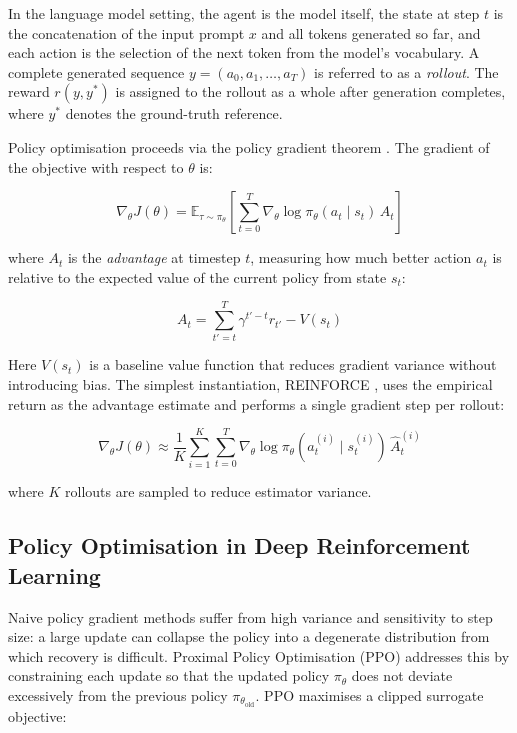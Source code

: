 \documentclass{iutbscthesis}
\begin{document}
In the language model setting, the agent is the model itself, the state at step $t$ is the
concatenation of the input prompt $x$ and all tokens generated so far, and each action
is the selection of the next token from the model's vocabulary. A complete generated
sequence $y = (a_0, a_1, \ldots, a_T)$ is referred to as a \textit{rollout}. The reward $r(y, y^*)$
is assigned to the rollout as a whole after generation completes, where $y^*$ denotes the
ground-truth reference.

Policy optimisation proceeds via the policy gradient theorem \cite{sutton1999policy}.
The gradient of the objective with respect to $\theta$ is:

\begin{equation}
    \nabla_\theta J(\theta) = \mathbb{E}_{\tau \sim \pi_\theta}\!\left[
        \sum_{t=0}^{T} \nabla_\theta \log \pi_\theta(a_t \mid s_t)\, A_t
    \right]
\end{equation}

\noindent where $A_t$ is the \textit{advantage} at timestep $t$, measuring how much better action
$a_t$ is relative to the expected value of the current policy from state $s_t$:

\begin{equation}
    A_t = \sum_{t'=t}^{T} \gamma^{t'-t} r_{t'} - V(s_t)
\end{equation}

\noindent Here $V(s_t)$ is a baseline value function that reduces gradient variance without
introducing bias. The simplest instantiation, REINFORCE \cite{williams1992simple},
uses the empirical return as the advantage estimate and performs a single gradient step
per rollout:

\begin{equation}
    \nabla_\theta J(\theta) \approx \frac{1}{K}\sum_{i=1}^{K}
        \sum_{t=0}^{T} \nabla_\theta \log \pi_\theta(a_t^{(i)} \mid s_t^{(i)})\, \hat{A}_t^{(i)}
\end{equation}

\noindent where $K$ rollouts are sampled to reduce estimator variance.

\subsection{Policy Optimisation in Deep Reinforcement Learning}

Naive policy gradient methods suffer from high variance and sensitivity to step size:
a large update can collapse the policy into a degenerate distribution from which
recovery is difficult. Proximal Policy Optimisation (PPO) \cite{schulman2017proximal}
addresses this by constraining each update so that the updated policy $\pi_\theta$ does not
deviate excessively from the previous policy $\pi_{\theta_{\text{old}}}$. PPO maximises a clipped
surrogate objective:
\end{document}
